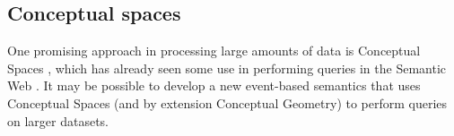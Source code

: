 \documentclass[../main.tex]{subfiles}
\begin{document}
\subsection{Conceptual spaces}

One promising approach in processing large amounts of data is Conceptual Spaces \cite{cs}, which has already seen some use in performing queries in the Semantic Web \cite{usesofcs}.  It may be possible to develop a new event-based semantics that uses Conceptual Spaces (and by extension Conceptual Geometry) to perform queries on larger datasets.
\end{document}

